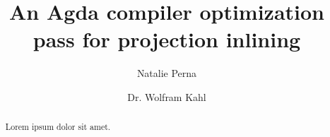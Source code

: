 \documentclass{Styles/llncs}
\title{An Agda compiler optimization pass for projection inlining}
\author{Natalie Perna\inst{1} \and Dr. Wolfram Kahl\inst{1}}
\institute{Department of Computing and Software, McMaster University}
\begin{document}
\maketitle

\begin{abstract}
Lorem ipsum dolor sit amet.
\end{abstract}
\end{document}
